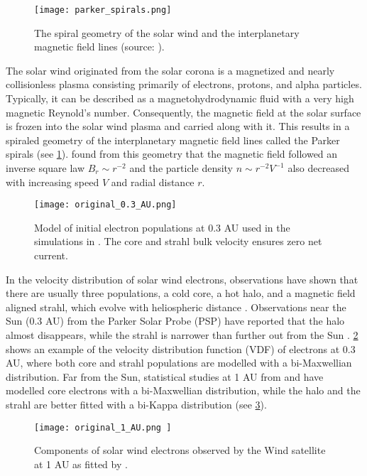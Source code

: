 \begin{figure}[h]
    \centering
    \texttt{[image: parker\_spirals.png]}
    \caption{The spiral geometry of the solar wind and the
    interplanetary magnetic field lines (source: \cite{NASA}).}
    \label{fig:spirals}
\end{figure}

The solar wind originated from the solar corona is a magnetized
and nearly collisionless plasma consisting primarily of electrons, protons, and
alpha particles. Typically, it can be described as a magnetohydrodynamic fluid
with a very high magnetic Reynold's number. Consequently, the magnetic field at
the solar surface is frozen into the solar wind plasma and carried along with
it. This results in a spiraled geometry of the interplanetary magnetic field
lines called the Parker spirals (see \cref{fig:spirals}). \cite{Parker1958}
found from this geometry that the magnetic field followed an inverse square law
$B_r\sim r^{-2}$ and the particle density $n\sim r^{-2}V^{-1}$ also decreased
with increasing speed $V$ and radial distance $r$.

\begin{figure}
    \centering
    \texttt{[image: original\_0.3\_AU.png]}
    \caption{Model of initial electron populations at 0.3 AU used in the
        simulations in \cite{Micera2020}. The core and
    strahl bulk velocity ensures zero net current.}
    \label{fig:03_AU_particles}
\end{figure}

In the velocity distribution of solar wind electrons, observations have shown
that there are usually three populations, a cold core, a hot halo, and a magnetic field aligned strahl, which evolve with heliospheric distance
\citep{Montgomery1968,Feldman1975,Pilipp1987}. Observations near the Sun (0.3 AU) from the Parker Solar Probe (PSP) have reported that the halo almost disappears, while the strahl is narrower than further out from the Sun \citep{Halekas2020}. \cref{fig:03_AU_particles} shows an example of the velocity
distribution function (VDF) of electrons at 0.3 AU, where both core and
strahl populations are modelled with a bi-Maxwellian distribution. Far from the
Sun, statistical studies at 1 AU from \cite{Maksimovic2005} and \cite{Wilson2019} have modelled core electrons with a bi-Maxwellian distribution, while the halo and the strahl are better fitted with a bi-Kappa distribution (see \cref{fig:solar_wind_electrons}).
\begin{figure}
    \centering
    \texttt{[image: original\_1\_AU.png ]}
    \caption{Components of solar wind electrons
observed by the Wind satellite at 1 AU as fitted by \cite{Wilson2019}.}
    \label{fig:solar_wind_electrons}
\end{figure}

